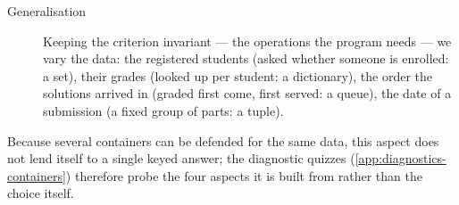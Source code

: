 \begin{description}
  \item[Generalisation] Keeping the criterion invariant --- the operations
    the program needs --- we vary the data: the registered students (asked
    whether someone is enrolled: a set), their grades (looked up per student:
    a dictionary), the order the solutions arrived in (graded first come,
    first served: a queue), the date of a submission (a fixed group of parts:
    a tuple).
\end{description}

Because several containers can be defended for the same data, this aspect
does not lend itself to a single keyed answer; the diagnostic quizzes
(\cref{app:diagnostics-containers}) therefore probe the four aspects it is
built from rather than the choice itself.
